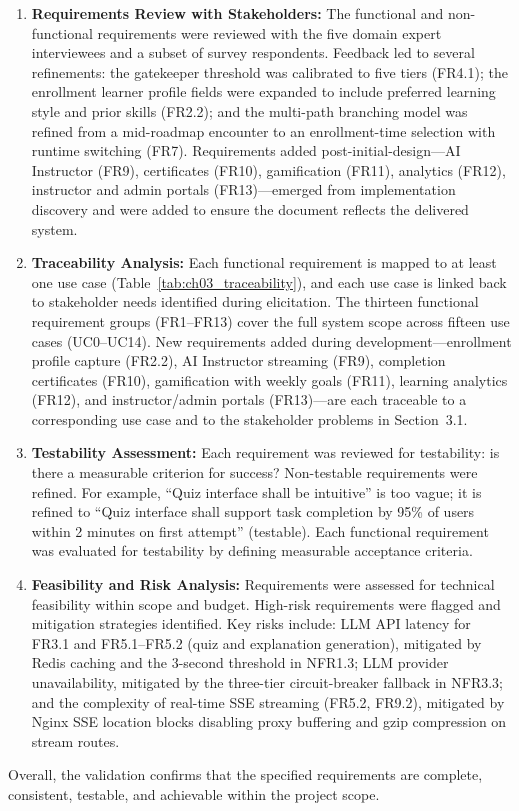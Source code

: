 \begin{enumerate}
    \item \textbf{Requirements Review with Stakeholders:} The functional and non-functional requirements were reviewed with the five domain expert interviewees and a subset of survey respondents. Feedback led to several refinements: the gatekeeper threshold was calibrated to five tiers (FR4.1); the enrollment learner profile fields were expanded to include preferred learning style and prior skills (FR2.2); and the multi-path branching model was refined from a mid-roadmap encounter to an enrollment-time selection with runtime switching (FR7). Requirements added post-initial-design---AI Instructor (FR9), certificates (FR10), gamification (FR11), analytics (FR12), instructor and admin portals (FR13)---emerged from implementation discovery and were added to ensure the document reflects the delivered system.

    \item \textbf{Traceability Analysis:} Each functional requirement is mapped to at least one use case (Table~\ref{tab:ch03_traceability}), and each use case is linked back to stakeholder needs identified during elicitation. The thirteen functional requirement groups (FR1--FR13) cover the full system scope across fifteen use cases (UC0--UC14). New requirements added during development---enrollment profile capture (FR2.2), AI Instructor streaming (FR9), completion certificates (FR10), gamification with weekly goals (FR11), learning analytics (FR12), and instructor/admin portals (FR13)---are each traceable to a corresponding use case and to the stakeholder problems in Section~3.1.

    \item \textbf{Testability Assessment:} Each requirement was reviewed for testability: is there a measurable criterion for success? Non-testable requirements were refined. For example, \enquote{Quiz interface shall be intuitive} is too vague; it is refined to \enquote{Quiz interface shall support task completion by 95\% of users within 2 minutes on first attempt} (testable). Each functional requirement was evaluated for testability by defining measurable acceptance criteria.

    \item \textbf{Feasibility and Risk Analysis:} Requirements were assessed for technical feasibility within scope and budget. High-risk requirements were flagged and mitigation strategies identified. Key risks include: LLM API latency for FR3.1 and FR5.1--FR5.2 (quiz and explanation generation), mitigated by Redis caching and the 3-second threshold in NFR1.3; LLM provider unavailability, mitigated by the three-tier circuit-breaker fallback in NFR3.3; and the complexity of real-time SSE streaming (FR5.2, FR9.2), mitigated by Nginx SSE location blocks disabling proxy buffering and gzip compression on stream routes.
\end{enumerate}

Overall, the validation confirms that the specified requirements are complete, consistent, testable, and achievable within the project scope.

